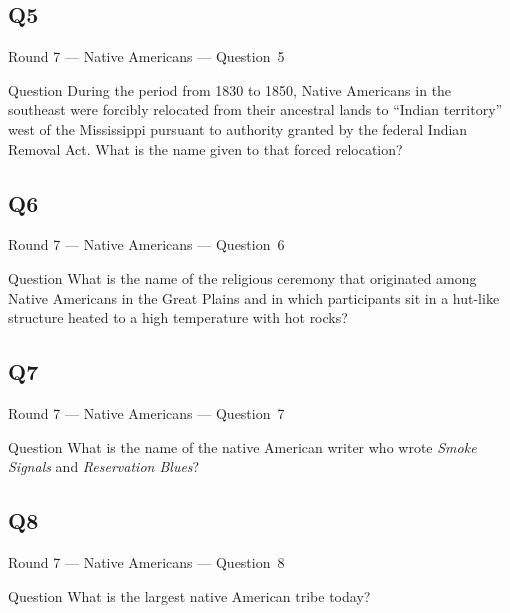 \documentclass[11pt]{beamer}
\begin{document}
\subsection*{Q5}
\begin{frame}[t]{Round 7 --- Native Americans --- \mbox{Question 5}}
    \vspace{-0.5em}
    \begin{block}{Question}
        During the period from 1830 to 1850, Native Americans in the southeast were forcibly relocated from their ancestral lands to ``Indian territory'' west of the Mississippi pursuant to authority granted by the federal Indian Removal Act.  What is the name given to that forced relocation?
    \end{block}
\end{frame}
\subsection*{Q6}
\begin{frame}[t]{Round 7 --- Native Americans --- \mbox{Question 6}}
    \vspace{-0.5em}
    \begin{block}{Question}
        What is the name of the religious ceremony that originated among Native Americans in the Great Plains and in which participants sit in a hut-like structure heated to a high temperature with hot rocks?
    \end{block}
\end{frame}
\subsection*{Q7}
\begin{frame}[t]{Round 7 --- Native Americans --- \mbox{Question 7}}
    \vspace{-0.5em}
    \begin{block}{Question}
        What is the name of the native American writer who wrote \emph{Smoke Signals} and \emph{Reservation Blues}?
    \end{block}
\end{frame}
\subsection*{Q8}
\begin{frame}[t]{Round 7 --- Native Americans --- \mbox{Question 8}}
    \vspace{-0.5em}
    \begin{block}{Question}
        What is the largest native American tribe today?
    \end{block}
\end{frame}
\end{document}
